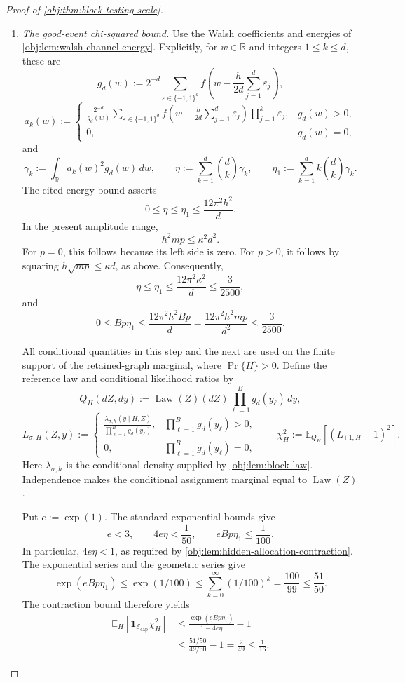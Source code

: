\documentclass[11pt]{article}
\begin{document}
\begin{proof}[Proof of \cref{obj:thm:block-testing-scale}]
\begin{enumerate}
\item \textit{The good-event chi-squared bound.}
Use the Walsh coefficients and energies of
\cref{obj:lem:walsh-channel-energy}. Explicitly, for \(w\in\mathbb R\) and integers \(1\le k\le d\), these are
\[
g_d(w):=
2^{-d}\sum_{\varepsilon\in\{-1,1\}^d}
f\!\left(w-\frac h{2d}\sum_{j=1}^{d}\varepsilon_j\right),
\]
\[
a_k(w):=
\begin{cases}
\displaystyle
\frac{2^{-d}}{g_d(w)}
\sum_{\varepsilon\in\{-1,1\}^d}
f\!\left(w-\frac h{2d}\sum_{j=1}^{d}\varepsilon_j\right)
\prod_{j=1}^{k}\varepsilon_j,
&g_d(w)>0,\\
0,&g_d(w)=0,
\end{cases}
\]
and
\[
\gamma_k:=\int_{\mathbb R}a_k(w)^2g_d(w)\,dw,
\qquad
\eta:=\sum_{k=1}^{d}\binom dk\gamma_k,
\qquad
\eta_1:=\sum_{k=1}^{d}k\binom dk\gamma_k.
\]
The cited energy bound asserts
\[
0\le\eta\le\eta_1\le\frac{12\pi^2h^2}{d}.
\]
In the present amplitude range,
\[
h^2mp\le\kappa^2d^2.
\]
For \(p=0\), this follows because its left side is zero. For \(p>0\), it follows by squaring
\(h\sqrt{mp}\le\kappa d\), as above. Consequently,
\[
\eta
\le\eta_1
\le\frac{12\pi^2\kappa^2}{d}
\le\frac3{2500},
\]
and
\[
0\le Bp\eta_1
\le
\frac{12\pi^2h^2Bp}{d}
=
\frac{12\pi^2h^2mp}{d^2}
\le\frac3{2500}.
\]

All conditional quantities in this step and the next are used on the finite support of the retained-graph marginal, where \(\Pr\{H\}>0\). Define the reference law and conditional likelihood ratios by
\[
Q_H(dZ,dy):=
\operatorname{Law}(Z)(dZ)\prod_{\ell=1}^{B}g_d(y_\ell)\,dy,
\]
\[
L_{\sigma,H}(Z,y):=
\begin{cases}
\displaystyle
\frac{\lambda_{\sigma,h}(y\mid H,Z)}
{\prod_{\ell=1}^{B}g_d(y_\ell)},
&\prod_{\ell=1}^{B}g_d(y_\ell)>0,\\
0,&\prod_{\ell=1}^{B}g_d(y_\ell)=0,
\end{cases}
\qquad
\chi_H^2:=\mathbb E_{Q_H}[(L_{+1,H}-1)^2].
\]
Here \(\lambda_{\sigma,h}\) is the conditional density supplied by
\cref{obj:lem:block-law}. Independence makes the conditional assignment marginal equal to \(\operatorname{Law}(Z)\).

Put \(e:=\exp(1)\). The standard exponential bounds give
\[
e<3,\qquad
4e\eta<\frac1{50},\qquad
eBp\eta_1\le\frac1{100}.
\]
In particular, \(4e\eta<1\), as required by
\cref{obj:lem:hidden-allocation-contraction}. The exponential series and the geometric series give
\[
\exp(eBp\eta_1)
\le\exp(1/100)
\le\sum_{k=0}^{\infty}(1/100)^k
=\frac{100}{99}
\le\frac{51}{50}.
\]
The contraction bound therefore yields
\[
\begin{aligned}
\mathbb E_H[\mathbf1_{\mathcal E_{\mathrm{cap}}}\chi_H^2]
&\le
\frac{\exp(eBp\eta_1)}{1-4e\eta}-1\\
&\le
\frac{51/50}{49/50}-1
=\frac2{49}
\le\frac1{16}.
\end{aligned}
\]


\end{enumerate}
\end{proof}
\end{document}
